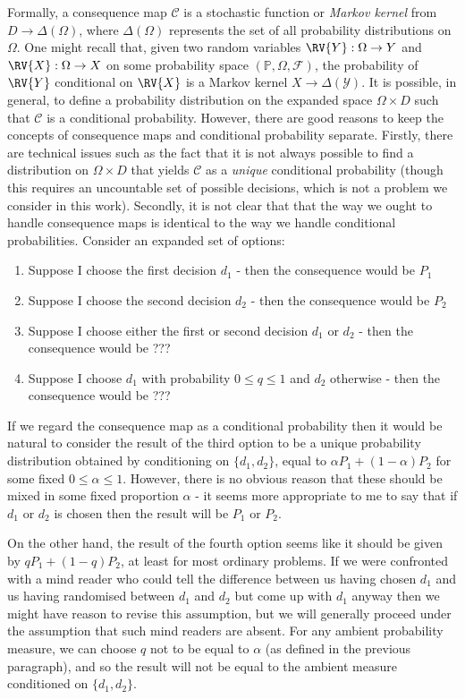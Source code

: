 Formally, a consequence map $\mathscr{C}$ is a stochastic function or \emph{Markov kernel} from $D\to \Delta(\Omega)$, where $\Delta(\Omega)$ represents the set of all probability distributions on $\Omega$. One might recall that, given two random variables $\RV{Y}:\Omega\to Y$ and $\RV{X}:\Omega \to X$ on some probability space $(\mathbb{P},\Omega,\mathcal{F})$, the probability of $\RV{Y}$ conditional on $\RV{X}$ is a Markov kernel $X\to \Delta(\mathcal{Y})$. It is possible, in general, to define a probability distribution on the expanded space $\Omega\times D$ such that $\mathscr{C}$ is a conditional probability. However, there are good reasons to keep the concepts of consequence maps and conditional probability separate. Firstly, there are technical issues such as the fact that it is not always possible to find a distribution on $\Omega\times D$ that yields $\mathscr{C}$ as a \emph{unique} conditional probability \citep{hajek_what_2003} (though this requires an uncountable set of possible decisions, which is not a problem we consider in this work). Secondly, it is not clear that that the way we ought to handle consequence maps is identical to the way we handle conditional probabilities. Consider an expanded set of options:

\begin{enumerate}
	\item Suppose I choose the first decision $d_1$ - then the consequence would be $P_1$
	\item Suppose I choose the second decision $d_2$ - then the consequence would be $P_2$
	\item Suppose I choose either the first or second decision $d_1$ or $d_2$ - then the consequence would be ???
	\item Suppose I choose $d_1$ with probability $0\leq q\leq 1$ and $d_2$ otherwise - then the consequence would be ???
\end{enumerate}

If we regard the consequence map as a conditional probability then it would be natural to consider the result of the third option to be a unique probability distribution obtained by conditioning on $\{d_1,d_2\}$, equal to  $\alpha P_1 + (1-\alpha)P_2$ for some fixed $0\leq \alpha\leq 1$. However, there is no obvious reason that these should be mixed in some fixed proportion $\alpha$ - it seems more appropriate to me to say that if $d_1$ or $d_2$ is chosen then the result will be $P_1$ or $P_2$.

On the other hand, the result of the fourth option seems like it should be given by $q P_1 + (1-q) P_2$, at least for most ordinary problems. If we were confronted with a mind reader who could tell the difference between us having chosen $d_1$ and us having randomised between $d_1$ and $d_2$ but come up with $d_1$ anyway then we might have reason to revise this assumption, but we will generally proceed under the assumption that such mind readers are absent. For any ambient probability measure, we can choose $q$ not to be equal to $\alpha$ (as defined in the previous paragraph), and so the result will not be equal to the ambient measure conditioned on $\{d_1,d_2\}$. 

